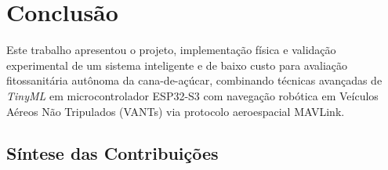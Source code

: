 \chapter{Conclusão}
\label{cap:conclusao}

Este trabalho apresentou o projeto, implementação física e validação experimental de um sistema inteligente e de baixo custo para avaliação fitossanitária autônoma da cana-de-açúcar, combinando técnicas avançadas de \textit{TinyML} em microcontrolador ESP32-S3 com navegação robótica em Veículos Aéreos Não Tripulados (VANTs) via protocolo aeroespacial MAVLink.

\section{Síntese das Contribuições}

